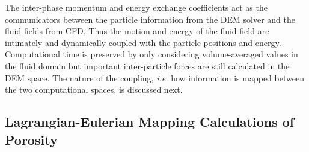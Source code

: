 The inter-phase momentum and energy exchange coefficients act as the communicators between the particle information from the DEM solver and the fluid fields from CFD. Thus the motion and energy of the fluid field are intimately and dynamically coupled with the particle positions and energy. Computational time is preserved by only considering volume-averaged values in the fluid domain but important inter-particle forces are still calculated in the DEM space. The nature of the coupling, \textit{i.e.} how information is mapped between the two computational spaces, is discussed next.%





\subsection{Lagrangian-Eulerian Mapping Calculations of Porosity}\label{sec:lag-eul-mapping}


